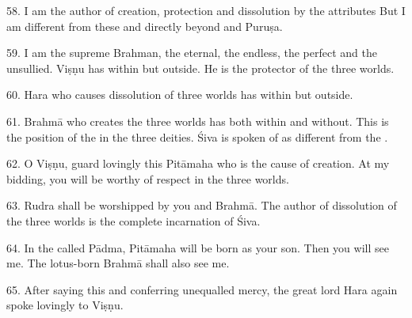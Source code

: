58. I am the author of creation, protection and dissolution by the attributes
 \etc But I am different from these  and directly beyond
 and Puruṣa.

59. I am the supreme Brahman, the eternal, the endless, the perfect and
the unsullied. Viṣṇu has  within but  outside. He is
the protector of the three worlds.

60. Hara who causes dissolution of three worlds has  within but
 outside.

61. Brahmā who creates the three worlds has  both within and without.
This is the position of the  in the three deities. Śiva is spoken of
as different from the .

62. O Viṣṇu, guard lovingly this Pitāmaha who is the cause of creation. At my
bidding, you will be worthy of respect in the three worlds.

63. Rudra shall be worshipped by you and Brahmā. The author of dissolution of
the three worlds is the complete incarnation of Śiva.

64. In the  called Pādma, Pitāmaha will be born as your son. Then you
will see me. The lotus-born Brahmā shall also see me.

65. After saying this and conferring unequalled mercy, the great lord Hara again
spoke lovingly to Viṣṇu.
